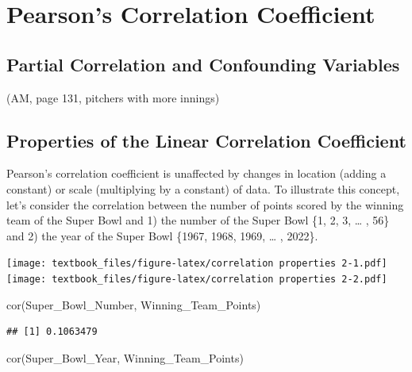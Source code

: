 \documentclass[
  11pt,
]{book}
\newenvironment{Shaded}{\begin{snugshade}}{\end{snugshade}}
\newcommand{\FunctionTok}[1]{\textcolor[rgb]{0.00,0.00,0.00}{#1}}
\newcommand{\NormalTok}[1]{#1}
\theoremstyle{definition}
\theoremstyle{definition}
\theoremstyle{definition}
\theoremstyle{definition}
\theoremstyle{remark}
\begin{document}
\hypertarget{pearsons-correlation-coefficient}{%
\section{Pearson's Correlation Coefficient}\label{pearsons-correlation-coefficient}}

\hypertarget{partial-correlation-and-confounding-variables}{%
\subsection{Partial Correlation and Confounding Variables}\label{partial-correlation-and-confounding-variables}}

(AM, page 131, pitchers with more innings)

\hypertarget{properties-of-the-linear-correlation-coefficient}{%
\subsection{Properties of the Linear Correlation Coefficient}\label{properties-of-the-linear-correlation-coefficient}}

Pearson's correlation coefficient is unaffected by changes in location (adding a constant) or scale (multiplying by a constant) of data. To illustrate this concept, let's consider the correlation between the number of points scored by the winning team of the Super Bowl and 1) the number of the Super Bowl \{1, 2, 3, \ldots{} , 56\} and 2) the year of the Super Bowl \{1967, 1968, 1969, \ldots{} , 2022\}.

\texttt{[image: textbook\_files/figure-latex/correlation properties 2-1.pdf]} \texttt{[image: textbook\_files/figure-latex/correlation properties 2-2.pdf]}

\begin{Shaded}
\begin{Highlighting}[]
\FunctionTok{cor}\NormalTok{(Super\_Bowl\_Number, Winning\_Team\_Points)}
\end{Highlighting}
\end{Shaded}

\begin{verbatim}
## [1] 0.1063479
\end{verbatim}

\begin{Shaded}
\begin{Highlighting}[]
\FunctionTok{cor}\NormalTok{(Super\_Bowl\_Year, Winning\_Team\_Points)}
\end{Highlighting}
\end{Shaded}
\end{document}
